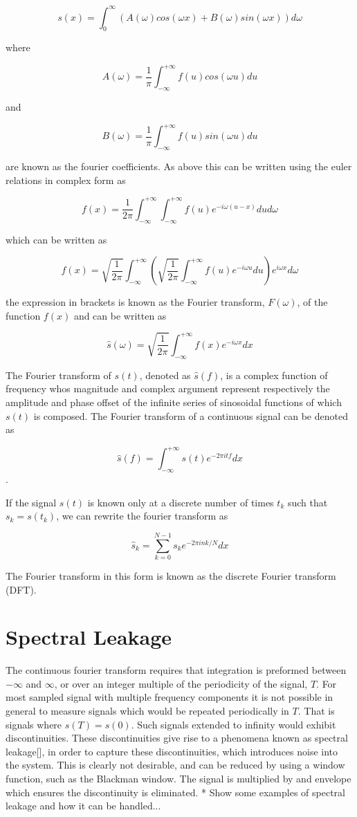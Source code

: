 $$
s(x) = \int_{0}^{\infty} \left( A(\omega) cos(\omega x) + B(\omega) sin(\omega x) \right) d\omega
$$

where

$$
A(\omega) = \frac{1}{\pi} \int_{-\infty}^{+\infty} f(u) cos(\omega u) du
$$

and

$$
B(\omega) = \frac{1}{\pi} \int_{-\infty}^{+\infty} f(u) sin(\omega u) du
$$

are known as the fourier coefficients. As above this can be written using the euler relations in complex form as

$$
f(x) = \frac{1}{2 \pi} \int_{-\infty}^{+\infty} \int_{-\infty}^{+\infty} f(u) e^{- i \omega (u - x)} du d\omega
$$

which can be written as

$$
f(x) = \sqrt{\frac{1}{2 \pi}} \int_{-\infty}^{+\infty} \left( \sqrt{\frac{1}{2 \pi}} \int_{-\infty}^{+\infty} f(u) e^{- i \omega u} du \right) e^{i \omega x} d\omega
$$

the expression in brackets is known as the Fourier transform, $F(\omega)$, of the function $f(x)$ and can be written as

$$
\hat{s}(\omega) = \sqrt{\frac{1}{2 \pi}} \int_{-\infty}^{+\infty} f(x) e^{- i \omega x} dx
$$

The Fourier transform of $s(t)$, denoted as $\hat{s}(f)$, is a complex function of frequency whos magnitude and complex argument represent respectively the amplitude and phase offset of the infinite series of sinosoidal functions of which $s(t)$ is composed. The Fourier transform of a continuous signal can be denoted as

$$
\hat{s}(f) = \int_{-\infty}^{+\infty} s(t) e^{-2 \pi i t f} dx
$$
.

If the signal $s(t)$ is known only at a discrete number of times $t_k$ such that $s_k = s(t_k)$, we can rewrite the fourier transform as

$$
\hat{s}_k = \sum_{k=0}^{N-1} s_k e^{-2 \pi i n k / N} dx
$$

The Fourier transform in this form is known as the discrete Fourier transform (DFT).

\section{Spectral Leakage}
The continuous fourier transform requires that integration is preformed between $-\infty$ and $\infty$, or over an integer multiple of the periodicity of the signal, $T$. For most sampled signal with multiple frequency components it is not possible in general to measure signals which would be repeated periodically in $T$. That is signals where $s(T) = s(0)$. Such signals extended to infinity would exhibit discontinuities. These discontinuities give rise to a phenomena known as spectral leakage[], in order to capture these discontinuities, which introduces noise into the system. This is clearly not desirable, and can be reduced by using a window function, such as the Blackman window. The signal is multiplied by and envelope which ensures the discontinuity is eliminated.
* Show some examples of spectral leakage and how it can be handled...

